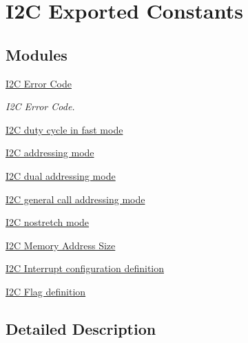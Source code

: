 \hypertarget{group___i2_c___exported___constants}{}\section{I2C Exported Constants}
\label{group___i2_c___exported___constants}
\subsection*{Modules}
\begin{DoxyCompactItemize}
\item 
\hyperlink{group___i2_c___error___code}{I2\+C Error Code}
\begin{DoxyCompactList}\small\item\em I2C Error Code. \end{DoxyCompactList}\item 
\hyperlink{group___i2_c__duty__cycle__in__fast__mode}{I2\+C duty cycle in fast mode}
\item 
\hyperlink{group___i2_c__addressing__mode}{I2\+C addressing mode}
\item 
\hyperlink{group___i2_c__dual__addressing__mode}{I2\+C dual addressing mode}
\item 
\hyperlink{group___i2_c__general__call__addressing__mode}{I2\+C general call addressing mode}
\item 
\hyperlink{group___i2_c__nostretch__mode}{I2\+C nostretch mode}
\item 
\hyperlink{group___i2_c___memory___address___size}{I2\+C Memory Address Size}
\item 
\hyperlink{group___i2_c___interrupt__configuration__definition}{I2\+C Interrupt configuration definition}
\item 
\hyperlink{group___i2_c___flag__definition}{I2\+C Flag definition}
\end{DoxyCompactItemize}


\subsection{Detailed Description}
